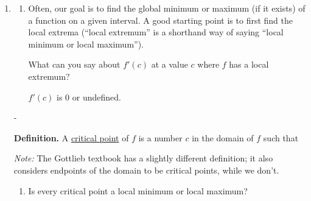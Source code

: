 \documentclass{article}
\makeatletter
\newlength{\tipmargin}
\renewenvironment{framed}{
  \setlength{\tipmargin}{\textwidth-\linewidth}
  \advance\@totalleftmargin-\tipmargin
  \def\FrameCommand{\hspace{\tipmargin}\fbox}%
  \advance\linewidth\tipmargin
  \MakeFramed {\advance\hsize-\width \FrameRestore}%
}
{\endMakeFramed}
\makeatother
\begin{document}
\begin{enumerate}[resume]
\begin{enumerate}
  \end{enumerate}

\item  %

  \begin{enumerate}

  \item


    \begin{problem}[\stretch{0.75}]
      Often, our goal is to find the global minimum or maximum (if it exists) of a function on a given interval. A good starting point is to first find the local extrema (``local extremum'' is a shorthand way of saying ``local minimum or local maximum'').

      What can you say about $f'(c)$ at a value $c$ where $f$ has a local
      extremum?
    \end{problem}

    \begin{solution}
      $f'(c)$ is 0 or undefined.
    \end{solution}

  \end{enumerate}

  \begin{framed}
    \textbf{Definition.} A \uline{critical point} of $f$ is a number $c$ in the domain of $f$ such that\probonly{\ldots} 

    \pspace{0.25in}

    \emph{Note:} The Gottlieb textbook has a slightly different definition; it also considers endpoints of the domain to be critical points, while we don't. 
  \end{framed}

  \pspace{\newpage}

  \begin{enumerate}[resume]
  \item


    \begin{problem}[\stretch{0.5}]
      Is every critical point a local minimum or local maximum?  
    \end{problem}


\end{enumerate}
\end{enumerate}
\end{document}
